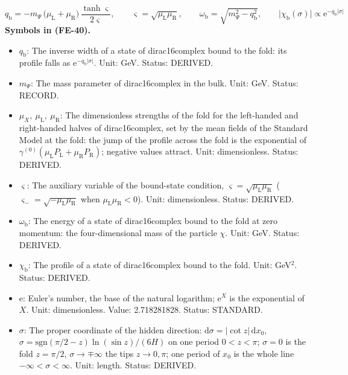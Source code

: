 \documentclass[
  10pt,
]{article}
\providecommand{\tightlist}{%
  \setlength{\itemsep}{0pt}\setlength{\parskip}{0pt}}
\begin{document}
\[
q_{\mathrm{b}} = -m_\Psi\,\big(\mu_{\mathrm{L}} + \mu_{\mathrm{R}}\big)\,\frac{\tanh\varsigma}{2\varsigma},\qquad \varsigma = \sqrt{\mu_{\mathrm{L}}\mu_{\mathrm{R}}},\qquad
\omega_{\mathrm{b}} = \sqrt{m_\Psi^2 - q_{\mathrm{b}}^2},\qquad \lvert\chi_{\mathrm{b}}(\sigma)\rvert \propto \mathrm{e}^{-q_{\mathrm{b}}\lvert\sigma\rvert} \tag{FE-40}
\] \textbf{Symbols in (FE-40).}

\begin{itemize}
\tightlist
\item
  \(q_{\mathrm{b}}\): The inverse width of a state of dirac16complex
  bound to the fold: its profile falls as
  \(\mathrm{e}^{-q_{\mathrm{b}}\lvert\sigma\rvert}\). Unit: GeV. Status:
  DERIVED.
\item
  \(m_\Psi\): The mass parameter of dirac16complex in the bulk. Unit:
  GeV. Status: RECORD.
\item
  \(\mu_X,\ \mu_{\mathrm{L}},\ \mu_{\mathrm{R}}\): The dimensionless
  strengths of the fold for the left-handed and right-handed halves of
  dirac16complex, set by the mean fields of the Standard Model at the
  fold: the jump of the profile across the fold is the exponential of
  \(\gamma^{(0)}(\mu_{\mathrm{L}}P_{\mathrm{L}} + \mu_{\mathrm{R}}P_{\mathrm{R}})\);
  negative values attract. Unit: dimensionless. Status: DERIVED.
\item
  \(\varsigma\): The auxiliary variable of the bound-state condition,
  \(\varsigma = \sqrt{\mu_{\mathrm{L}}\mu_{\mathrm{R}}}\)
  (\(\varsigma_- = \sqrt{-\mu_{\mathrm{L}}\mu_{\mathrm{R}}}\) when
  \(\mu_{\mathrm{L}}\mu_{\mathrm{R}} < 0\)). Unit: dimensionless.
  Status: DERIVED.
\item
  \(\omega_{\mathrm{b}}\): The energy of a state of dirac16complex bound
  to the fold at zero momentum: the four-dimensional mass of the
  particle \(\chi\). Unit: GeV. Status: DERIVED.
\item
  \(\chi_{\mathrm{b}}\): The profile of a state of dirac16complex bound
  to the fold. Unit: GeV\(^{2}\). Status: DERIVED.
\item
  \(\mathrm{e}\): Euler's number, the base of the natural logarithm;
  \(\mathrm{e}^{X}\) is the exponential of \(X\). Unit: dimensionless.
  Value: 2.718281828. Status: STANDARD.
\item
  \(\sigma\): The proper coordinate of the hidden direction:
  \(\mathrm{d}\sigma = \lvert\cot z\rvert\,\mathrm{d}x_0\),
  \(\sigma = \mathrm{sgn}(\pi/2 - z)\ln(\sin z)/(6H)\) on one period
  \(0 < z < \pi\); \(\sigma = 0\) is the fold \(z = \pi/2\),
  \(\sigma \to \mp\infty\) the tips \(z \to 0, \pi\); one period of
  \(x_0\) is the whole line \(-\infty < \sigma < \infty\). Unit: length.
  Status: DERIVED.
\end{itemize}
\end{document}
